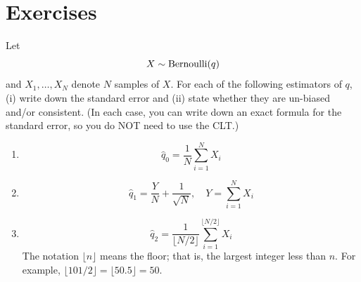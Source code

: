 \newpage

\section*{Exercises}
\begin{exercise}\label{ex:1}
Let
\begin{equation*}
X \sim {\rm Bernoulli}(q)
\end{equation*}
and $X_1,\dots,X_N$ denote $N$ samples of $X$. 
For each of the following estimators of $q$, (i) write down the standard error and (ii) state whether they are un-biased and/or consistent. (In each case, you can write down an exact formula for the standard error, so you do NOT need to use the CLT.)
\begin{enumerate}[label=(\alph*)]
\item 
\begin{equation*}
\hat{q}_{0} = \frac{1}{N}\sum_{i=1}^NX_i
\end{equation*}
\item 
\begin{equation*}
\hat{q}_{1} = \frac{Y}{N} + \frac{1}{\sqrt{N}},\quad Y = \sum_{i=1}^NX_i
\end{equation*}
\item 
\begin{equation*}
\hat{q}_{2} = \frac{1}{\lfloor N/2 \rfloor}\sum_{i=1}^{\lfloor N/2 \rfloor}X_i
\end{equation*}
The notation $\lfloor  n \rfloor$ means the floor; that is, the largest integer less than $n$. For example, $\lfloor 101/2 \rfloor = \lfloor 50.5 \rfloor = 50$. 
\end{enumerate}

\end{exercise}





